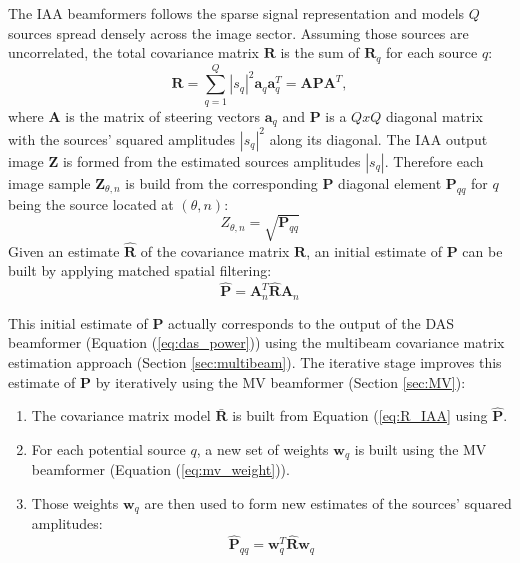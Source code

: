 \noindent
The IAA beamformers follows the sparse signal representation and models $Q$ sources spread densely across the image sector. Assuming those sources are uncorrelated, the total covariance matrix $\boldsymbol{R}$ is the sum of $\boldsymbol{R}_q$ for each source $q$:
\begin{equation}
    \boldsymbol{R} = \sum_{q=1}^{Q} |s_q|^2 \boldsymbol{a}_q \boldsymbol{a}_q^T = \boldsymbol{A} \boldsymbol{P} \boldsymbol{A}^T,
\label{eq:R_IAA}
\end{equation}
\noindent
where $\boldsymbol{A}$ is the matrix of steering vectors $\boldsymbol{a}_q$ and $\boldsymbol{P}$ is a $Q x Q$ diagonal matrix with the sources' squared amplitudes $|s_q|^2$ along its diagonal.
The IAA output image $\boldsymbol{Z}$ is formed from the estimated sources amplitudes $|s_q|$. Therefore each image sample $\boldsymbol{Z}_{\theta,n}$ is build from the corresponding $\boldsymbol{P}$ diagonal element $\boldsymbol{P}_{qq}$ for $q$ being the source located at $(\theta,n)$:
\begin{equation}
    Z_{\theta,n} = \sqrt{\boldsymbol{P}_{qq}}
\label{eq:IAA_output}
\end{equation}
\noindent
Given an estimate $\boldsymbol{\hat{R}}$ of the covariance matrix $\boldsymbol{R}$, an initial estimate of $\boldsymbol{P}$ can be built by applying matched spatial filtering:
\begin{equation}
    \boldsymbol{\hat{P}} = \boldsymbol{A}_n^T \boldsymbol{\hat{R}} \boldsymbol{A}_n
\end{equation}

\noindent
This initial estimate of $\boldsymbol{P}$ actually corresponds to the output of the DAS beamformer (Equation (\ref{eq:das_power})) using the multibeam covariance matrix estimation approach (Section \ref{sec:multibeam}).
The iterative stage improves this estimate of $\boldsymbol{P}$ by iteratively using the MV beamformer (Section \ref{sec:MV}):
\begin{enumerate}
    \item The covariance matrix model $\boldsymbol{\bar{R}}$ is built from Equation (\ref{eq:R_IAA} using $\boldsymbol{\hat{P}}$.
    \item For each potential source $q$, a new set of weights $\boldsymbol{w}_q$ is built using the MV beamformer (Equation (\ref{eq:mv_weight})).
    \item Those weights $\boldsymbol{w}_q$ are then used to form new estimates of the sources' squared amplitudes:
    \begin{equation}
        \boldsymbol{\hat{P}}_{qq} = \boldsymbol{w}_q^T \boldsymbol{\hat{R}} \boldsymbol{w}_q
    \label{eq:mb_output}
    \end{equation}
\end{enumerate}

